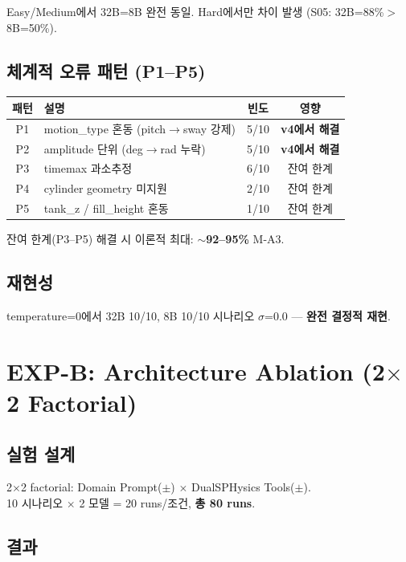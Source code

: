 \documentclass[10pt,a4paper]{article}
\begin{document}
Easy/Medium에서 32B=8B 완전 동일. Hard에서만 차이 발생 (S05: 32B=88\%$>$8B=50\%).

\subsection{체계적 오류 패턴 (P1--P5)}

\begin{center}
\renewcommand{\arraystretch}{1.1}
\begin{tabular}{clcc}
\toprule
패턴 & 설명 & 빈도 & 영향 \\
\midrule
P1 & motion\_type 혼동 (pitch$\rightarrow$sway 강제) & 5/10 & \textbf{v4에서 해결} \\
P2 & amplitude 단위 (deg$\rightarrow$rad 누락) & 5/10 & \textbf{v4에서 해결} \\
P3 & timemax 과소추정 & 6/10 & 잔여 한계 \\
P4 & cylinder geometry 미지원 & 2/10 & 잔여 한계 \\
P5 & tank\_z / fill\_height 혼동 & 1/10 & 잔여 한계 \\
\bottomrule
\end{tabular}
\end{center}

잔여 한계(P3--P5) 해결 시 이론적 최대: \textbf{$\sim$92--95\%} M-A3.

\subsection{재현성}

temperature=0에서 32B 10/10, 8B 10/10 시나리오 $\sigma$=0.0 — \textbf{완전 결정적 재현}.

\section{EXP-B: Architecture Ablation (2$\times$2 Factorial)}

\subsection{실험 설계}

2$\times$2 factorial: Domain Prompt($\pm$) $\times$ DualSPHysics Tools($\pm$).\\
10 시나리오 $\times$ 2 모델 = 20 runs/조건, \textbf{총 80 runs}.

\subsection{결과}
\end{document}
